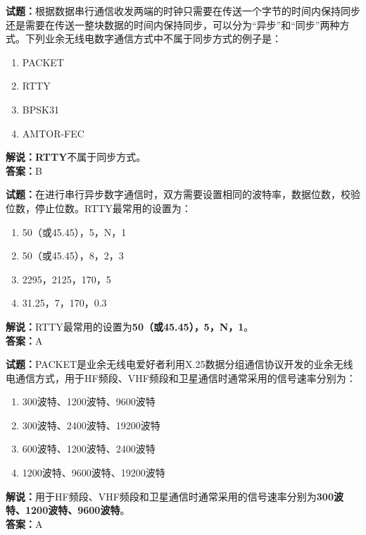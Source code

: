 \documentclass{ctexbook}
\begin{document}
\bigskip


\noindent\textbf{试题：}根据数据串行通信收发两端的时钟只需要在传送一个字节的时间内保持同步还是需要在传送一整块数据的时间内保持同步，可以分为“异步”和“同步”两种方式。下列业余无线电数字通信方式中不属于同步方式的例子是：
\begin{enumerate}[leftmargin=3em]
\item PACKET
\item RTTY
\item BPSK31
\item AMTOR-FEC
\end{enumerate}
\noindent\textbf{解说：}\textbf{RTTY}不属于同步方式。\\\noindent\textbf{答案：}B



\bigskip


\noindent\textbf{试题：}在进行串行异步数字通信时，双方需要设置相同的波特率，数据位数，校验位数，停止位数。RTTY最常用的设置为：
\begin{enumerate}[leftmargin=3em]
\item 50（或45.45），5，N，1
\item 50（或45.45），8，2，3
\item 2295，2125，170，5
\item 31.25，7，170，0.3
\end{enumerate}
\noindent\textbf{解说：}RTTY最常用的设置为\textbf{50（或45.45），5，N，1}。\\\noindent\textbf{答案：}A



\bigskip


\noindent\textbf{试题：}PACKET是业余无线电爱好者利用X.25数据分组通信协议开发的业余无线电通信方式，用于HF频段、VHF频段和卫星通信时通常采用的信号速率分别为：
\begin{enumerate}[leftmargin=3em]
\item 300波特、1200波特、9600波特
\item 300波特、2400波特、19200波特
\item 600波特、1200波特、2400波特
\item 1200波特、9600波特、19200波特
\end{enumerate}
\noindent\textbf{解说：}用于HF频段、VHF频段和卫星通信时通常采用的信号速率分别为\textbf{300波特、1200波特、9600波特}。\\\noindent\textbf{答案：}A



\bigskip
\end{document}
